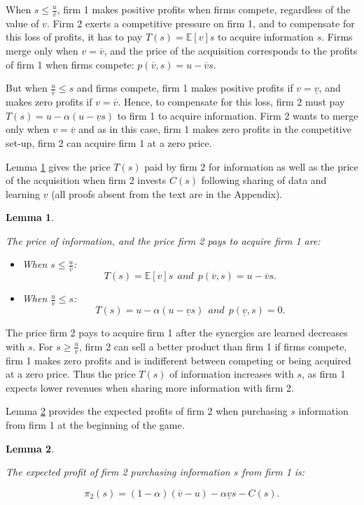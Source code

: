 \documentclass[a4paper,leqno]{article}%
\newtheorem{lemma}{Lemma}
\newcommand{\E}{\mathbb E}
\renewcommand{\a}{\alpha}
\newcommand{\uv}{\underline{v}}
\newcommand{\ov}{\overline{v}}
\begin{document}
When $s\leq \frac{u}{\ov}$, firm 1 makes positive profits when firms compete, regardless of the value of $v$. Firm 2 exerts a competitive pressure on firm 1, and to compensate for this loss of profits, it has to pay $T(s)=\E[v]s$ to acquire information $s$. Firms merge only when $v=\ov$, and the price of the acquisition corresponds to the profits of firm 1 when firms compete: $p(\ov,s)=u-\ov s$.

But when $\frac{u}{\ov}\leq s$ and firms compete, firm 1 makes positive profits if $v=\uv$, and makes zero profits if $v=\ov$. Hence, to compensate for this loss, firm 2 must pay $T(s)=u-\a(u-\uv s)$ to firm 1 to acquire information. Firm 2 wants to merge only when $v=\ov$ and as in this case, firm 1 makes zero profits in the competitive set-up, firm 2 can acquire firm 1 at a zero price.


Lemma \ref{lem1} gives the price $T(s)$ paid by firm 2 for information as well as the price of the acquisition when firm 2 invests $C(s)$ following sharing of data and learning $v$ (all proofs absent from the text are in the Appendix).

\begin{lemma}~~\label{lem1}

The price of information, and the price firm 2 pays to acquire firm 1 are: 

\begin{itemize}
    \item When $s\leq \frac{u}{\ov}$:
    $$T(s)=\E[v]s~~and~~p(\ov,s)=u-\ov s.$$ 
    
    \item When $\frac{u}{\ov}\leq s$:
    $$T(s)=u-\a(u-\uv s)~~and~~p(\uv,s)=0.$$
 \end{itemize}

\end{lemma}

\noindent The price firm 2 pays to acquire firm 1 after the synergies are learned decreases with $s$. For $s\geq\frac{u}{\ov}$, firm 2 can sell a better product than firm 1 if firms compete, firm 1 makes zero profits and is indifferent between competing or being acquired at a zero price. Thus the price $T(s)$ of information increases with $s$, as firm 1 expects lower revenues when sharing more information with firm 2.

\medskip

Lemma \ref{lem2} provides the expected profits of firm 2 when purchasing $s$ information from firm 1 at the beginning of the game. 

\begin{lemma}~~\label{lem2}

The expected profit of firm 2 purchasing information $s$ from firm 1 is:

    $$\pi_2(s)=(1-\a)(\ov -u)-\a \uv s-C(s).$$ 

\end{lemma}
\end{document}
